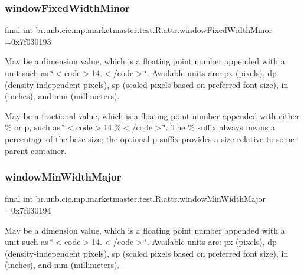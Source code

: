 \subsubsection{\texorpdfstring{window\+Fixed\+Width\+Minor}{windowFixedWidthMinor}}
{\footnotesize\ttfamily final int br.\+unb.\+cic.\+mp.\+marketmaster.\+test.\+R.\+attr.\+window\+Fixed\+Width\+Minor =0x7f030193\hspace{0.3cm}{\ttfamily [static]}}

May be a dimension value, which is a floating point number appended with a unit such as \char`\"{}$<$code$>$14.\+5sp$<$/code$>$\char`\"{}. Available units are\+: px (pixels), dp (density-\/independent pixels), sp (scaled pixels based on preferred font size), in (inches), and mm (millimeters). 

May be a fractional value, which is a floating point number appended with either \% or p, such as \char`\"{}$<$code$>$14.\%$<$/code$>$\char`\"{}. The \% suffix always means a percentage of the base size; the optional p suffix provides a size relative to some parent container. \mbox{\label{classbr_1_1unb_1_1cic_1_1mp_1_1marketmaster_1_1test_1_1R_1_1attr_aa6e88a236914d2fb19ec86f44cc8e877}} 
\subsubsection{\texorpdfstring{window\+Min\+Width\+Major}{windowMinWidthMajor}}
{\footnotesize\ttfamily final int br.\+unb.\+cic.\+mp.\+marketmaster.\+test.\+R.\+attr.\+window\+Min\+Width\+Major =0x7f030194\hspace{0.3cm}{\ttfamily [static]}}

May be a dimension value, which is a floating point number appended with a unit such as \char`\"{}$<$code$>$14.\+5sp$<$/code$>$\char`\"{}. Available units are\+: px (pixels), dp (density-\/independent pixels), sp (scaled pixels based on preferred font size), in (inches), and mm (millimeters). 

